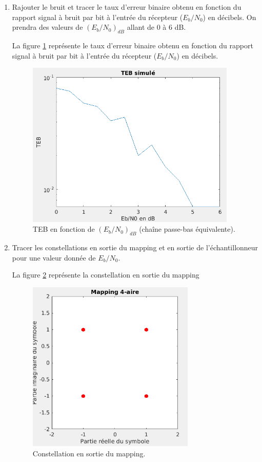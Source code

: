 \documentclass[frenchb]{article}
\begin{document}
\begin{enumerate}
    \item Rajouter le bruit et tracer le taux d'erreur binaire obtenu en fonction du rapport signal à bruit par bit à l'entrée du récepteur ($E_b/N_0$) en décibels. On prendra des valeurs de $\left(E_b/N_0\right)_{dB}$ allant de $0$ à $6$ dB.
    \par\leavevmode\par
    \setlength\parindent{0.5cm}
    La figure \ref{F23} représente le taux d'erreur binaire obtenu en fonction du rapport signal à bruit par bit à l'entrée du récepteur ($E_b/N_0$) en décibels.
    \begin{figure}[ht!]
    		\centering
		\includegraphics[width=10cm]{C2tebs.png}		              	 	\caption{TEB en fonction de $\left(E_b/N_0\right)_{dB}$ (chaîne passe-bas équivalente). \label{F23}}
	\end{figure}
	\newpage
    \item Tracer les constellations en sortie du mapping et en sortie de l'échantillonneur pour une valeur donnée de $E_b/N_0$.
    \par\leavevmode\par
    \setlength\parindent{0.5cm}
    La figure \ref{F24} représente la constellation en sortie du mapping
    \begin{figure}[ht!]
    		\centering
		\includegraphics[width=8cm]{C1const.png}		              	 	\caption{Constellation en sortie du mapping. \label{F24}}

\end{figure}
\end{enumerate}
\end{document}
